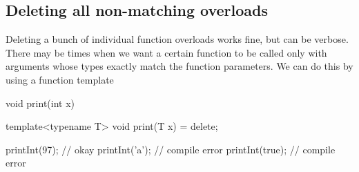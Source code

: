 \documentclass{report}
\begin{document}
\subsection{Deleting all non-matching overloads }
\bigbreak \noindent 
Deleting a bunch of individual function overloads works fine, but can be verbose. There may be times when we want a certain function to be called only with arguments whose types exactly match the function parameters. We can do this by using a function template
\bigbreak \noindent 
\begin{cppcode}
    void print(int x) {}
    
    template<typename T>
    void print(T x) = delete;

    printInt(97);   // okay
    printInt('a');  // compile error
    printInt(true); // compile error
\end{cppcode}
\end{document}
